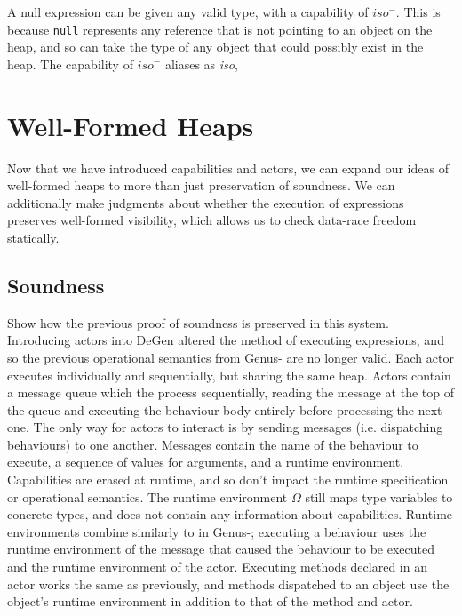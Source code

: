 A null expression can be given any valid type, with a capability of $\textit{iso}^-$. This is because \texttt{null} represents any reference that is not pointing to an object on the heap, and so can take the type of any object that could possibly exist in the heap. The capability of $\textit{iso}^-$ aliases as \textit{iso}, 

\newpage

\section{Well-Formed Heaps}

Now that we have introduced capabilities and actors, we can expand our ideas of well-formed heaps to more than just preservation of soundness. We can additionally make judgments about whether the execution of expressions preserves well-formed visibility, which allows us to check data-race freedom statically.

\subsection{Soundness} \label{sec:degen-sound}

Show how the previous proof of soundness is preserved in this system. \\

Introducing actors into DeGen altered the method of executing expressions, and so the previous operational semantics from Genus- are no longer valid. Each actor executes individually and sequentially, but sharing the same heap. Actors contain a message queue which the process sequentially, reading the message at the top of the queue and executing the behaviour body entirely before processing the next one. The only way for actors to interact is by sending messages (i.e. dispatching behaviours) to one another. Messages contain the name of the behaviour to execute, a sequence of values for arguments, and a runtime environment. \\

Capabilities are erased at runtime, and so don't impact the runtime specification or operational semantics. The runtime environment $\Omega$ still maps type variables to concrete types, and does not contain any information about capabilities. Runtime environments combine similarly to in Genus-; executing a behaviour uses the runtime environment of the message that caused the behaviour to be executed and the runtime environment of the actor. Executing methods declared in an actor works the same as previously, and methods dispatched to an object use the object's runtime environment in addition to that of the method and actor. \\


